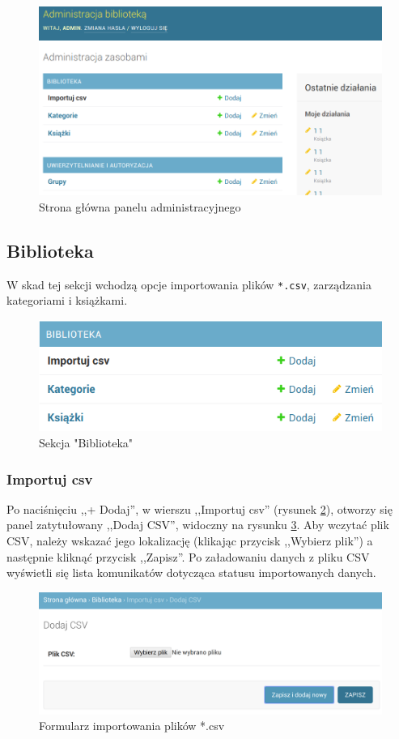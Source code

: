 \documentclass[twoside]{projektInzynierskiMS}
\begin{document}
\begin{figure}[h]
  \centering
  \includegraphics[width=0.4\linewidth]{img/backend/PanelAdmin.png}
  \caption{Strona główna panelu administracyjnego}
  \label{fig:adminPanel}
\end{figure}

\subsection{Biblioteka}
W skad tej sekcji wchodzą opcje importowania plików \verb`*.csv`, zarządzania kategoriami i książkami.

\begin{figure}[h]
  \centering
  \includegraphics[width=0.6\linewidth]{img/backend/biblioteka.png}
  \caption{Sekcja "Biblioteka"}
  \label{fig:biblioteka}
\end{figure}

\subsubsection{Importuj csv}
Po naciśnięciu ,,+ Dodaj'', w wierszu ,,Importuj csv'' (rysunek \ref{fig:biblioteka}), otworzy się panel zatytułowany ,,Dodaj CSV'', widoczny na rysunku \ref{fig:importCSV}. Aby wczytać plik CSV, należy wskazać jego lokalizację (klikając przycisk ,,Wybierz plik'') a następnie kliknąć przycisk ,,Zapisz''. Po załadowaniu danych z pliku CSV wyświetli się lista komunikatów dotycząca statusu importowanych danych. 

\begin{figure}[h]
  \centering
  \includegraphics[width=0.6\linewidth]{img/backend/ImportCSV.png}
  \caption{Formularz importowania plików *.csv}
  \label{fig:importCSV}
\end{figure}
\end{document}
